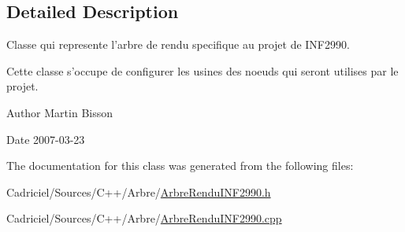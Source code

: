 \subsection{Detailed Description}
Classe qui represente l'arbre de rendu specifique au projet de I\-N\-F2990. 

Cette classe s'occupe de configurer les usines des noeuds qui seront utilises par le projet.

\begin{DoxyAuthor}{Author}
Martin Bisson 
\end{DoxyAuthor}
\begin{DoxyDate}{Date}
2007-\/03-\/23 
\end{DoxyDate}


The documentation for this class was generated from the following files\-:\begin{DoxyCompactItemize}
\item 
Cadriciel/\-Sources/\-C++/\-Arbre/\hyperlink{_arbre_rendu_i_n_f2990_8h}{Arbre\-Rendu\-I\-N\-F2990.\-h}\item 
Cadriciel/\-Sources/\-C++/\-Arbre/\hyperlink{_arbre_rendu_i_n_f2990_8cpp}{Arbre\-Rendu\-I\-N\-F2990.\-cpp}\end{DoxyCompactItemize}
